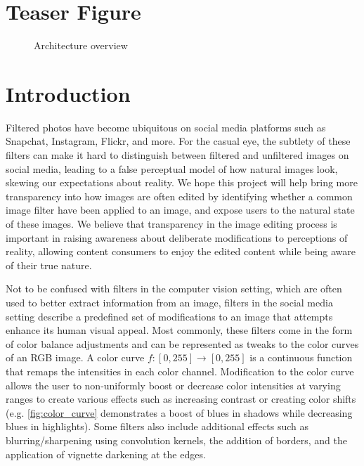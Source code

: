 \documentclass[11pt]{article}
\begin{document}
\newcommand{\cimg}[2] {
    \begin{minipage}{#2}\centering \texttt{[image: \#1]}\end{minipage}
}

\section*{Teaser Figure}

\begin{figure}[H]
    \centering

    \caption{Architecture overview}
    \label{fig:overview}
\end{figure}


\section*{Introduction}
Filtered photos have become ubiquitous on social media platforms such as Snapchat, Instagram, Flickr, and more. For the casual eye, the subtlety of these filters can make it hard to distinguish between filtered and unfiltered images on social media, leading to a false perceptual model of how natural images look, skewing our expectations about reality. We hope this project will help bring more transparency into how images are often edited by identifying whether a common image filter have been applied to an image, and expose users to the natural state of these images. We believe that transparency in the image editing process is important in raising awareness about deliberate modifications to perceptions of reality, allowing content consumers to enjoy the edited content while being aware of their true nature.

Not to be confused with filters in the computer vision setting, which are often used to better extract information from an image, filters in the social media setting describe a predefined set of modifications to an image that attempts enhance its human visual appeal. Most commonly, these filters come in the form of color balance adjustments and can be represented as tweaks to the color curves of an RGB image. A color curve $f: [0, 255] \to [0, 255]$ is a continuous function that remaps the intensities in each color channel. Modification to the color curve allows the user to non-uniformly boost or decrease color intensities at varying ranges to create various effects such as increasing contrast or creating color shifts (e.g. \cref{fig:color_curve} demonstrates a boost of blues in shadows while decreasing blues in highlights). Some filters also include additional effects such as blurring/sharpening using convolution kernels, the addition of borders, and the application of vignette darkening at the edges.
\end{document}
